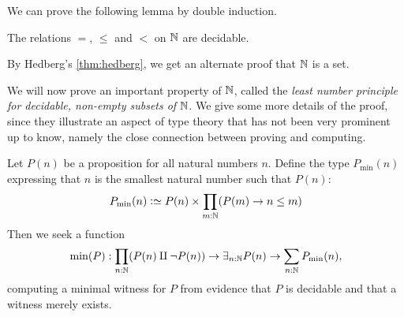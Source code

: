 We can prove the following lemma by double induction.

\begin{lemma}\label{lem:dec-eq+order-N}
The relations $=$, $\leq$ and $<$ on $\mathbb{N}$ are decidable.
\end{lemma}
By Hedberg's \cref{thm:hedberg}, we get an alternate proof that $\mathbb{N}$ is a set.

We will now prove an important property of $\mathbb{N}$, called the
\emph{least number principle for decidable, non-empty subsets of} $\mathbb{N}$.
We give some more details of the proof, since they illustrate an aspect
of type theory that has not been very prominent up to know, namely
the close connection between proving and computing.

\begin{construction}
\label{def:Nwellordered}
Let $P(n)$ be a proposition for all natural numbers $n$.
Define the type $P_{\min}(n)$ expressing that $n$ is the smallest
natural number such that $P(n)$:
\[
P_{\min}(n) \defeq P(n) \times \prod_{m:\NN} (P(m) \to n\leq m)
\]
Then we seek a function
\begin{equation}\label{eqn:min}
\min(P) : \prod_{n:\mathbb{N}}(P(n)\amalg\neg P(n)) \to
          \exists_{n:\mathbb{N}} P(n) \to \sum_{n:\mathbb{N}} P_{\min}(n),
\end{equation}
computing a minimal witness for $P$
from evidence that $P$ is decidable and that a witness merely exists.
\end{construction}
